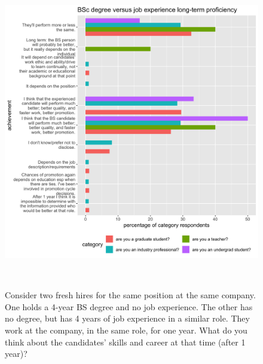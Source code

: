 \documentclass{sigchi}
\begin{document}
\begin{figure}
\includegraphics[scale=0.2]{../data-analysis/plots_output/BSc_degree_versus_job_experience_long-term_proficiency.png}
 \caption{Consider two fresh hires for the same position at the same company. One holds a 4-year BS degree and no job experience. The other has no degree, but has 4 years of job experience in a similar role. They work at the company, in the same role, for one year. What do you think about the candidates' skills and career at that time (after 1 year)?}~\label{fig:figure9}
\end{figure}
\end{document}
